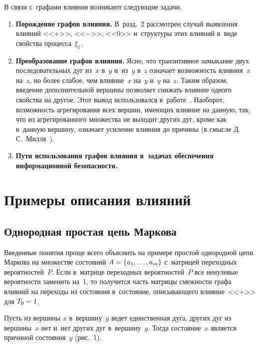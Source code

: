 \begin{multicols}{2}
  В связи с~графами влияния возникают следу\-ющие задачи.
  \begin{enumerate}[1.]
\item \textbf{Порождение графов влияния.} В~разд.~2 рас\-смот\-рен случай выявления 
влияний <<$+$>>, <<$-$>>, <<0>> и~структуры этих влияний в~виде свойства 
процесса~$\xi_1$.\\[-5pt] 
\item \textbf{Преобразование графов влияния.} Ясно, что транзитивное замыкание 
двух последовательных дуг из~$x$ в~$y$ и~из~$y$ в~$z$ означает 
возможность влияния~$x$ на~$z$, но более слабое, чем влияние~$x$ на~$y$ 
и~$y$ на~$z$. Таким образом, введение дополнительной вершины позволяет 
снижать влияние одного свойства на другое. Этот вывод использовался 
в~работе~\cite{10-gru}. Наоборот, возможность агрегирования всех вершин, 
имеющих влияние на данную, так, что из агрегированного множества не 
выходит других дуг, кроме как в~данную вершину, означает усиление 
влияния до причины (в смысле Д.\,С.~Милля~\cite{6-gru}).\\[-5pt] 
\item \textbf{Пути использования графов влияния в~задачах обеспечения 
информационной безопасности.}
\end{enumerate}
  
\section{Примеры описания влияний}

  \subsection{Однородная простая цепь Маркова}
  
  Введенные понятия проще всего объяснить на примере простой однородной 
цепи Маркова на множестве состояний  $A\hm= \{a_1, \ldots ,a_m\}$ с~матрицей 
переходных вероятностей~$P$. Если в~матрице переходных вероятностей~$P$ 
все ненулевые вероятности заменить на~1, то получится часть матрицы 
смежности графа влияний на переходы из состояния в~состояние, 
описывающего влияние~<<$+$>> для $T_0\hm=1$. 
  
  Пусть из вершины $x$ в~вершину~$y$ ведет единственная дуга, других дуг 
из вершины~$x$ нет и~нет других дуг в~вершину~$y$. Тогда состояние~$x$ 
является причиной состояния~$y$ (рис.~1). 

  \pagebreak
   

 \noindent
 \begin{center}  %
 \vspace*{1pt}
 \mbox{%
 \epsfxsize=77.822mm
 }




\end{center}
\end{multicols}
